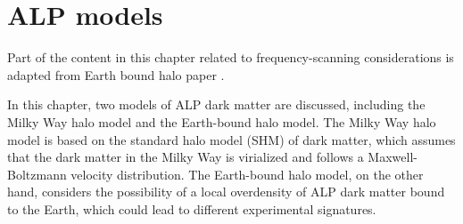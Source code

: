 \chapter{ALP models}\label{chap:theory}
\begin{jointwork}
    Part of the content in this chapter related to frequency-scanning considerations is adapted from Earth bound halo paper .
\end{jointwork}

In this chapter, two models of ALP dark matter are discussed, including the Milky Way halo model and the Earth-bound halo model. 
The Milky Way halo model is based on the standard halo model (SHM) of dark matter, which assumes that the dark matter in the Milky Way is virialized and follows a Maxwell-Boltzmann velocity distribution. 
The Earth-bound halo model, on the other hand, considers the possibility of a local overdensity of ALP dark matter bound to the Earth, which could lead to different experimental signatures.
